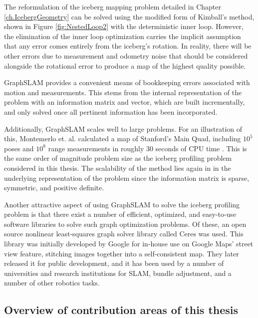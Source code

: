 The reformulation of the iceberg mapping problem detailed in Chapter \ref{ch.IcebergGeometry} can be solved using the modified form of Kimball's method, shown in Figure \ref{fig:NestedLoop2} with the deterministic inner loop. However, the elimination of the inner loop optimization carries the implicit assumption that any error comes entirely from the iceberg's rotation. In reality, there will be other errors due to measurement and odometry noise that should be considered alongside the rotational error to produce a map of the highest quality possible. 

GraphSLAM provides a convenient means of bookkeeping errors associated with motion and measurements. This stems from the internal representation of the problem with an information matrix and vector, which are built incrementally, and only solved once all pertinent information has been incorporated. 


Additionally, GraphSLAM scales well to large problems. For an illustration of this, Montemerlo et. al. calculated a map of Stanford's Main Quad, including $10^5$ poses and $10^8$ range measurements in roughly 30 seconds of CPU time \cite{?}. This is the same order of magnitude problem size as the iceberg profiling problem considered in this thesis. The scalability of the method lies again in in the underlying representation of the problem since the information matrix is sparse, symmetric, and positive definite.

Another attractive aspect of using GraphSLAM to solve the iceberg profiling problem is that there exist a number of efficient, optimized, and easy-to-use software libraries to solve such graph optimization problems. Of these, an open source nonlinear least-squares graph solver library called Ceres was used. This library was initially developed by Google for in-house use on Google Maps' street view feature, stitching images together into a self-consistent map. They later released it for public development, and it has been used by a number of universities and research institutions for SLAM, bundle adjustment, and a number of other robotics tasks. \cite{ceres}

\subsection{Overview of contribution areas of this thesis}

